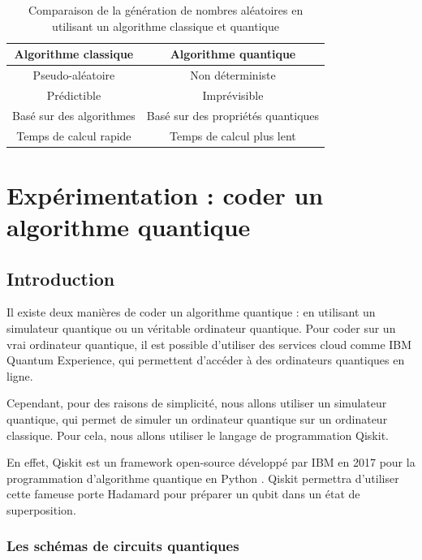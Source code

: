 \documentclass{article}
\begin{document}
\begin{table}[H]
  \centering
  \begin{tabular}{|c|c|}
    \hline
    \textbf{Algorithme classique} & \textbf{Algorithme quantique} \\
    \hline
    Pseudo-aléatoire & Non déterministe \\
    \hline
    Prédictible & Imprévisible \\
    \hline
    Basé sur des algorithmes & Basé sur des propriétés quantiques \\
    \hline
    Temps de calcul rapide & Temps de calcul plus lent \\
    \hline
  \end{tabular}
  \caption{Comparaison de la génération de nombres aléatoires en utilisant un algorithme classique et quantique}
\end{table}

\section{Expérimentation : coder un algorithme quantique}

\subsection{Introduction}

Il existe deux manières de coder un algorithme quantique : en utilisant un simulateur quantique
ou un véritable ordinateur quantique. Pour coder sur un vrai ordinateur quantique, il est possible
d'utiliser des services cloud comme IBM Quantum Experience, qui permettent d'accéder à des
ordinateurs quantiques en ligne. \cite{wikipediaQuantumPlatform}

Cependant, pour des raisons de simplicité, nous allons utiliser un simulateur quantique, qui
permet de simuler un ordinateur quantique sur un ordinateur classique. Pour cela, nous allons
utiliser le langage de programmation Qiskit.

En effet, Qiskit est un framework open-source développé par IBM en 2017 pour la programmation
d'algorithme quantique en Python \cite{wikipediaQiskitWikipedia}. Qiskit permettra d'utiliser cette fameuse 
porte Hadamard pour préparer un qubit dans un état de superposition.

\subsubsection{Les schémas de circuits quantiques}
\end{document}
